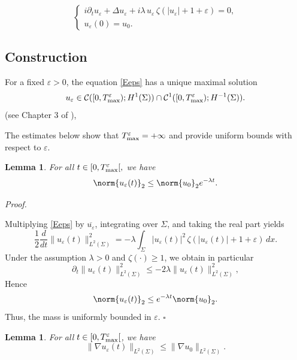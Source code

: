 \documentclass[10pt]{article}
\newtheorem{lemma}[theorem]{Lemma}
\renewenvironment{proof}[1][Proof]{%
  \noindent\textit{#1. }%
}{\hfill$\square$\vspace{4pt}}
\begin{document}
\begin{equation}\tag{NLS-$\zeta_\epsilon$}\label{Eeps}
\begin{cases}
i \partial_t u_\varepsilon + \Delta u_\varepsilon + i \lambda \, u_\varepsilon \, \zeta(|u_\varepsilon|+1+\varepsilon) = 0,\\
u_\varepsilon(0) = u_0.
\end{cases}
\end{equation}
\subsection{Construction}
For a fixed $\varepsilon > 0$, the equation \eqref{Eeps} has a unique maximal solution \[
u_\varepsilon \in \mathcal{C}([0,T_{\rm max}^{\varepsilon}); H^1(\Sigma)) \cap \mathcal{C}^1([0,T_{\rm max}^{\varepsilon}); H^{-1}(\Sigma)).
\] (see Chapter 3 of \cite{2}),

The estimates below show that $T_{\rm max}^{\varepsilon} = +\infty$ and provide uniform bounds with respect to $\varepsilon$.

\begin{lemma}\label{mass}
    For all $t\in [0,T_{\rm max}^{\varepsilon}[,$ we have $$\norm{u_\varepsilon(t)}_2\leq \norm{u_0}_2e^{-\lambda t}.$$ 
\end{lemma}
\begin{proof}
    Multiplying \eqref{Eeps} by $\overline{u_\varepsilon}$, integrating over $\Sigma$, and taking the real part yields
\[
\frac{1}{2} \frac{d}{dt} \|u_\varepsilon(t)\|_{L^2(\Sigma)}^2
= -\lambda \int_\Sigma |u_\varepsilon(t)|^2 \, \zeta(|u_\varepsilon(t)| + 1 + \varepsilon) \, dx.
\]
Under the assumption $\lambda>0$ and $\zeta(\cdot)\ge 1$, we obtain in particular
\begin{equation}\label{mass_bound}
\partial_t\|u_\varepsilon(t)\|_{L^2(\Sigma)}^2 \le -2\lambda\|u_\varepsilon(t)\|_{L^2(\Sigma)}^2,
\end{equation}
Hence $$\norm{u_\varepsilon(t)}_2\leq e^{-\lambda t}\norm{u_0}_2.$$
Thus, the mass is uniformly bounded in $\varepsilon$.
\end{proof}

\begin{lemma}\label{3}
For all $t\in [0,T_{\rm max}^{\varepsilon}[$, we have
\begin{equation}\label{grad_bound}
\|\nabla u_\varepsilon(t)\|_{L^2(\Sigma)} \le \|\nabla u_0\|_{L^2(\Sigma)}.
\end{equation}
\end{lemma}
\end{document}
